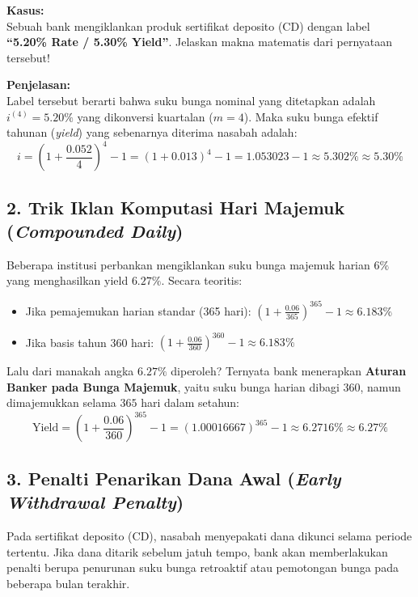 \documentclass[11pt,a4paper]{article}
\begin{document}
\begin{examplebox}
\textbf{Kasus:}\\
Sebuah bank mengiklankan produk sertifikat deposito (CD) dengan label \textbf{``5.20\% Rate / 5.30\% Yield''}. Jelaskan makna matematis dari pernyataan tersebut!

\vspace{0.5em}
\textbf{Penjelasan:}\\
Label tersebut berarti bahwa suku bunga nominal yang ditetapkan adalah $i^{(4)} = 5.20\%$ yang dikonversi kuartalan ($m = 4$). Maka suku bunga efektif tahunan (\textit{yield}) yang sebenarnya diterima nasabah adalah:
\begin{equation*}
    i = \left( 1 + \frac{0.052}{4} \right)^4 - 1 = (1 + 0.013)^4 - 1 = 1.053023 - 1 \approx 5.302\% \approx 5.30\%
\end{equation*}
\end{examplebox}

\subsection{2. Trik Iklan Komputasi Hari Majemuk (\textit{Compounded Daily})}
Beberapa institusi perbankan mengiklankan suku bunga majemuk harian $6\%$ yang menghasilkan yield $6.27\%$. Secara teoritis:
\begin{itemize}
    \item Jika pemajemukan harian standar (365 hari): $\left(1 + \frac{0.06}{365}\right)^{365} - 1 \approx 6.183\%$
    \item Jika basis tahun 360 hari: $\left(1 + \frac{0.06}{360}\right)^{360} - 1 \approx 6.183\%$
\end{itemize}
Lalu dari manakah angka $6.27\%$ diperoleh? 
Ternyata bank menerapkan \textbf{Aturan Banker pada Bunga Majemuk}, yaitu suku bunga harian dibagi $360$, namun dimajemukkan selama $365$ hari dalam setahun:
\begin{equation}
    \text{Yield} = \left(1 + \frac{0.06}{360}\right)^{365} - 1 = (1.00016667)^{365} - 1 \approx 6.2716\% \approx 6.27\%
\end{equation}

\subsection{3. Penalti Penarikan Dana Awal (\textit{Early Withdrawal Penalty})}
Pada sertifikat deposito (CD), nasabah menyepakati dana dikunci selama periode tertentu. Jika dana ditarik sebelum jatuh tempo, bank akan memberlakukan penalti berupa penurunan suku bunga retroaktif atau pemotongan bunga pada beberapa bulan terakhir.
\end{document}

